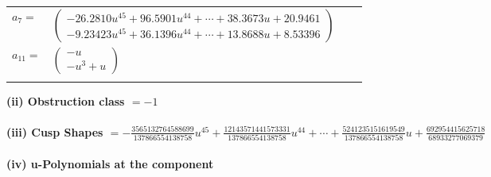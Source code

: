 \documentclass[1p]{elsarticle_modified}
\theoremstyle{definition}
\begin{document}
\begin{tabular}{m{7pt} m{180pt} m{7pt} m{180pt} }
\flushright $a_{7}=$&$\begin{pmatrix}-26.2810 u^{45}+96.5901 u^{44}+\cdots+38.3673 u+20.9461\\-9.23423 u^{45}+36.1396 u^{44}+\cdots+13.8688 u+8.53396\end{pmatrix}$ \\
\flushright $a_{11}=$&$\begin{pmatrix}- u\\- u^3+u\end{pmatrix}$\\&\end{tabular}
\flushleft \textbf{(ii) Obstruction class $= -1$}\\~\\
\flushleft \textbf{(iii) Cusp Shapes $= -\frac{3565132764588699}{137866554138758} u^{45}+\frac{12143571441573331}{137866554138758} u^{44}+\cdots+\frac{5241235151619549}{137866554138758} u+\frac{692954415625718}{68933277069379}$}\\~\\
\newpage\renewcommand{\arraystretch}{1}
\flushleft \textbf{(iv) u-Polynomials at the component}\newline \\
\end{document}
